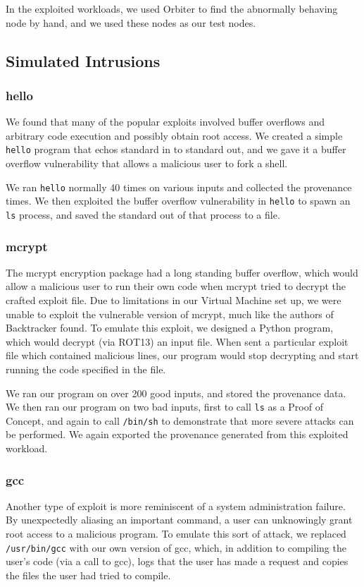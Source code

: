 \documentclass[10pt,twocolumn]{article}
\begin{document}
In the exploited workloads, we used Orbiter \cite{orbiter} to find the abnormally behaving node by hand, and we used these nodes as our test nodes.

\subsection{Simulated Intrusions}

\subsubsection{hello}
We found that many of the popular exploits \cite{metasploit, exploitdb} involved buffer overflows and arbitrary code execution and possibly obtain root access. We created a simple \texttt{hello} program that echos standard in to standard out, and we gave it a buffer overflow vulnerability that allows a malicious user to fork a shell.

We ran \texttt{hello} normally 40 times on various inputs and collected the provenance times. We then exploited the buffer overflow vulnerability in \texttt{hello} to spawn an \texttt{ls} process, and saved the standard out of that process to a file.

\subsubsection{mcrypt}
The mcrypt encryption package had a long standing buffer overflow, which would allow a malicious user to run their own code when mcrypt tried to decrypt the crafted exploit file. Due to limitations in our Virtual Machine set up, we were unable to exploit the vulnerable version of mcrypt, much like the authors of Backtracker \cite{backtracker} found. To emulate this exploit, we designed a Python program, which would decrypt (via ROT13) an input file. When sent a particular exploit file which contained malicious lines, our program would stop decrypting and start running the code specified in the file.

We ran our program on over 200 good inputs, and stored the provenance data. We then ran our program on two bad inputs, first to call \texttt{ls} as a Proof of Concept, and again to call \texttt{/bin/sh} to demonstrate that more severe attacks can be performed. We again exported the provenance generated from this exploited workload.

\subsubsection{gcc}
Another type of exploit is more reminiscent of a system administration failure. By unexpectedly aliasing an important command, a user can unknowingly grant root access to a malicious program. To emulate this sort of attack, we replaced \texttt{/usr/bin/gcc} with our own version of gcc, which, in addition to compiling the user's code (via a call to gcc), logs that the user has made a request and copies the files the user had tried to compile. 
\end{document}
